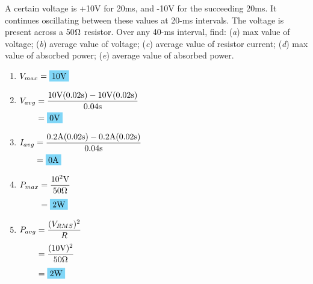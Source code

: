 A certain voltage is +10V for 20ms, and -10V for the succeeding 20ms. It continues oscillating between these values at 20-ms intervals. The voltage is present across a 50$\si{.\ohm}$ resistor. Over any 40-ms interval, find: (\emph{a}) max value of voltage; (\emph{b}) average value of voltage; (\emph{c}) average value of resistor current; (\emph{d}) max value of absorbed power; (\emph{e}) average value of absorbed power.
\\
\begin{enumerate}[leftmargin=2cm,labelsep=.5cm,label=\bfseries\alph*)]
	\item $
	\begin{aligned}[t]
	V_{max} &= \hlbox{10\qw{\V}}
	\end{aligned} $
	\\[1cm]
	
	\item $
	\begin{aligned}[t]
	V_{avg} &=\frac{10\qw{\V}(0.02\qw{\s})-10\qw{\V}(0.02\qw{\s})}{0.04\qw{\s}} \\
	&= \hlbox{0\qw{\V}}
	\end{aligned} $
	\\[1cm]
	
	\item $
	\begin{aligned}[t]
	I_{avg} &=\frac{0.2\qw{\A}(0.02\qw{\s})-0.2\qw{\A}(0.02\qw{\s})}{0.04\qw{\s}} \\
	&= \hlbox{0\qw{\A}}
	\end{aligned} $
	\\[1cm]
	
	\item $
	\begin{aligned}[t]
	P_{max} &= \frac{10^2\qw{\V}}{50\qw{\ohm}} \\[1mm]
	&= \hlbox{2\qw{\W}}
	\end{aligned} $
	\\[1cm]
	
	\item $
	\begin{aligned}[t]
	P_{avg} &= \frac{(V_{RMS})^2}{R} \\[1mm]
	&= \frac{(10\qw{\V})^2}{50\qw{\ohm}} \\[1mm]
	&= \hlbox{2\qw{\W}}
	\end{aligned} $
	\\[1cm]
\end{enumerate}